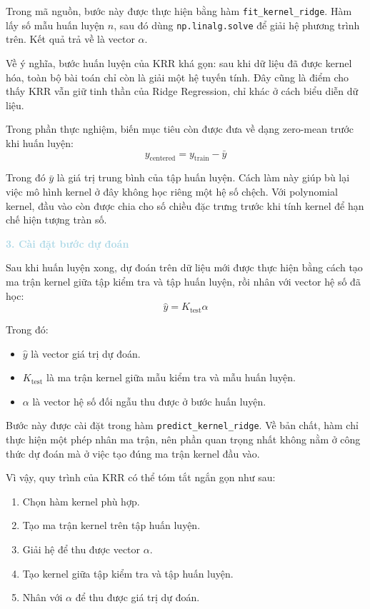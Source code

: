Trong mã nguồn, bước này được thực hiện bằng hàm \texttt{fit\_kernel\_ridge}. Hàm lấy số mẫu huấn luyện $n$, sau đó dùng \texttt{np.linalg.solve} để giải hệ phương trình trên. Kết quả trả về là vector $\alpha$.

Về ý nghĩa, bước huấn luyện của KRR khá gọn: sau khi dữ liệu đã được kernel hóa, toàn bộ bài toán chỉ còn là giải một hệ tuyến tính. Đây cũng là điểm cho thấy KRR vẫn giữ tinh thần của Ridge Regression, chỉ khác ở cách biểu diễn dữ liệu.

Trong phần thực nghiệm, biến mục tiêu còn được đưa về dạng zero-mean trước khi huấn luyện:
\begin{equation}
    y_{\mathrm{centered}} = y_{\mathrm{train}} - \bar{y}
\end{equation}

Trong đó $\bar{y}$ là giá trị trung bình của tập huấn luyện. Cách làm này giúp bù lại việc mô hình kernel ở đây không học riêng một hệ số chệch. Với polynomial kernel, đầu vào còn được chia cho số chiều đặc trưng trước khi tính kernel để hạn chế hiện tượng tràn số.

\noindent\textcolor{lightblue}{\textbf{3. Cài đặt bước dự đoán}}

Sau khi huấn luyện xong, dự đoán trên dữ liệu mới được thực hiện bằng cách tạo ma trận kernel giữa tập kiểm tra và tập huấn luyện, rồi nhân với vector hệ số đã học:
\begin{equation}
    \hat{y} = K_{\mathrm{test}}\alpha
\end{equation}

Trong đó:
\begin{itemize}
    \item $\hat{y}$ là vector giá trị dự đoán.
    \item $K_{\mathrm{test}}$ là ma trận kernel giữa mẫu kiểm tra và mẫu huấn luyện.
    \item $\alpha$ là vector hệ số đối ngẫu thu được ở bước huấn luyện.
\end{itemize}

Bước này được cài đặt trong hàm \texttt{predict\_kernel\_ridge}. Về bản chất, hàm chỉ thực hiện một phép nhân ma trận, nên phần quan trọng nhất không nằm ở công thức dự đoán mà ở việc tạo đúng ma trận kernel đầu vào.

Vì vậy, quy trình của KRR có thể tóm tắt ngắn gọn như sau:
\begin{enumerate}
    \item Chọn hàm kernel phù hợp.
    \item Tạo ma trận kernel trên tập huấn luyện.
    \item Giải hệ để thu được vector $\alpha$.
    \item Tạo kernel giữa tập kiểm tra và tập huấn luyện.
    \item Nhân với $\alpha$ để thu được giá trị dự đoán.
\end{enumerate}

